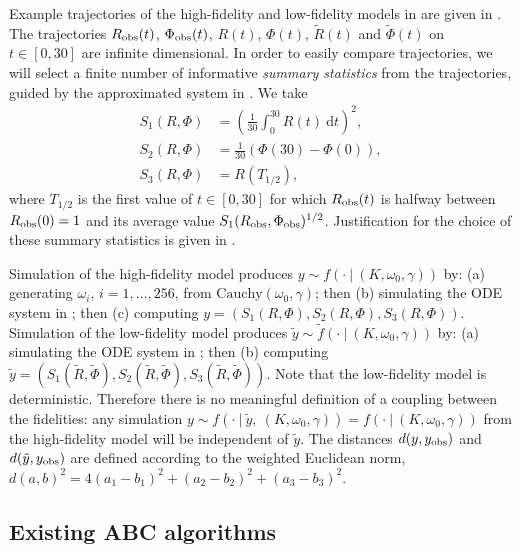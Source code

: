 \documentclass[review,demo]{siamonline190516}
\begin{document}
Example trajectories of the high-fidelity and low-fidelity models in  are given in .
The trajectories $R_{\mathrm{obs}}(t)$, $\Phi_{\mathrm{obs}}(t)$, $R(t)$, $\Phi(t)$, $\tilde R(t)$ and $\tilde \Phi(t)$ on $t \in [0,30]$ are infinite dimensional.
In order to easily compare trajectories, we will select a finite number of informative \emph{summary statistics} from the trajectories, guided by the approximated system in .
We take
\begin{align*}
S_1(R, \Phi) &= \left( \frac{1}{30} \int_0^{30} R(t) ~\mathrm dt \right)^2, \\
S_2(R, \Phi) &= \frac{1}{30} \left( \Phi(30) - \Phi(0) \right), \\
S_3(R, \Phi) &= R \left( T_{1/2} \right),
\end{align*}
where $T_{1/2}$ is the first value of $t \in [0,30]$ for which $R_{\mathrm{obs}}(t)$ is halfway between $R_{\mathrm{obs}}(0)=1$ and its average value $S_1(R_{\mathrm{obs}}, \Phi_{\mathrm{obs}})^{1/2}$.
Justification for the choice of these summary statistics is given in .

Simulation of the high-fidelity model produces $y \sim f(\cdot~|~(K, \omega_0, \gamma))$ by: 
(a) generating $\omega_i$, $i=1,\dots,256$, from $\mathrm{Cauchy}(\omega_0, \gamma)$; then 
(b) simulating the ODE system in ; then 
(c) computing $y = (S_1(R, \Phi), S_2(R, \Phi), S_3(R, \Phi))$.
Simulation of the low-fidelity model produces $\tilde y \sim \tilde f(\cdot~|~(K, \omega_0, \gamma))$ by: 
(a) simulating the ODE system in ; then
(b) computing $\tilde y = (S_1(\tilde R, \tilde \Phi), S_2(\tilde R, \tilde \Phi), S_3(\tilde R, \tilde \Phi))$.
Note that the low-fidelity model is deterministic.
Therefore there is no meaningful definition of a coupling between the fidelities: any simulation $y \sim f(\cdot~|~\tilde y,~(K, \omega_0, \gamma)) = f(\cdot~|~(K, \omega_0, \gamma))$ from the high-fidelity model will be independent of $\tilde y$.
The distances $d(y, y_{\mathrm{obs}})$ and $d(\tilde y, y_{\mathrm{obs}})$ are defined according to the weighted Euclidean norm, $d(a,b)^2 = 4(a_1 - b_1)^2 + (a_2 - b_2)^2 + (a_3 - b_3)^2$.

\subsection{Existing ABC algorithms}
\label{s:existing}
\end{document}
